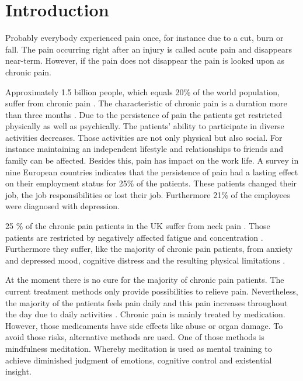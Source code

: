 \chapter{Introduction}
Probably everybody experienced pain once, for instance due to a cut, burn or fall. The pain occurring right after an injury is called acute pain and disappears near-term. However, if the pain does not disappear the pain is looked upon as chronic pain. \cite{Briggs2010,Mello2016}

Approximately 1.5 billion people, which equals 20\% of the world population, suffer from chronic pain \cite{Zeidan2016,Macfarlanea2016}. The characteristic of chronic pain is a duration more than three months \cite{Mello2016}. Due to the persistence of pain the patients get restricted physically as well as psychically. 
The patients' ability to participate in diverse activities decreases. Those activities are not only physical but also social. For instance maintaining an independent lifestyle and relationships to friends and family can be affected. Besides this, pain has impact on the work life. A survey in nine European countries %
indicates that the persistence of pain had a lasting effect on their employment status for 25\% of the patients. These patients changed their job, the job responsibilities or lost their job. Furthermore  21\% of the employees were diagnosed with depression. \cite{Breivik2006} 

25 \% of the chronic pain patients in the UK suffer from neck pain \cite{Macfarlanea2016}. Those patients are restricted by negatively affected fatigue and concentration \cite{vanRanderaat2016}. Furthermore they suffer, like the majority of chronic pain patients, from anxiety and depressed mood, cognitive distress and the resulting physical limitations \cite{gross2013}.

At the moment there is no cure for the majority of chronic pain patients. The current treatment methods only provide possibilities to relieve pain. \cite{marcus2009,pope2017} Nevertheless, the majority of the patients feels pain daily and this pain increases throughout the day due to daily activities \cite{Breivik2006}.
Chronic pain is mainly treated by medication. However, those medicaments have side effects like abuse or organ damage. To avoid those risks, alternative methods are used. One of those methods is mindfulness meditation. Whereby meditation is used as mental training to achieve diminished judgment of emotions, cognitive control and existential insight. \cite{Zeidan2012}

